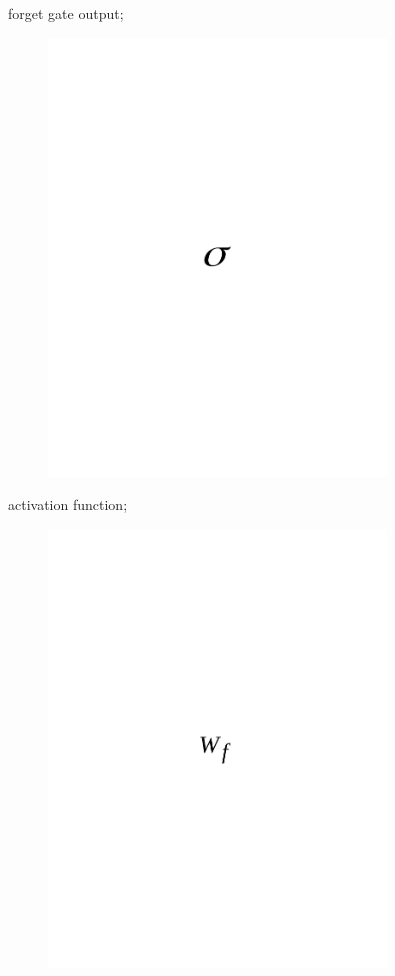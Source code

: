 forget gate output;
\begin{figure}[H]
	\centering
	\includegraphics[width=0.8\textwidth]{media/ict/image47}
	\caption*{}
\end{figure}

activation function;
\begin{figure}[H]
	\centering
	\includegraphics[width=0.8\textwidth]{media/ict/image48}
	\caption*{}
\end{figure}

